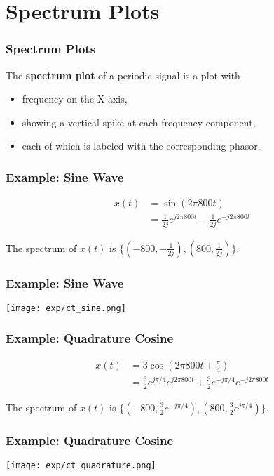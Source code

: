 \documentclass{beamer}
\begin{document}
\section[Spectrum Plots]{Spectrum Plots}
\setcounter{subsection}{1}

\begin{frame}
  \frametitle{Spectrum Plots}

  The {\bf spectrum plot} of a periodic signal is a plot with
  \begin{itemize}
  \item frequency on the X-axis,
  \item showing a vertical spike at each frequency component,
  \item each of which is labeled with the corresponding phasor.
  \end{itemize}
\end{frame}

\begin{frame}
  \frametitle{Example: Sine Wave}

  \begin{align*}
    x(t) &= \sin\left(2\pi 800t\right)\\
    &= \frac{1}{2j}e^{j2\pi 800t} - \frac{1}{2j}e^{-j2\pi 800t}
  \end{align*}

  The spectrum of $x(t)$ is $\{(-800,-\frac{1}{2j}),(800,\frac{1}{2j})\}$.
\end{frame}

\begin{frame}
  \frametitle{Example: Sine Wave}

  \centerline{\texttt{[image: exp/ct\_sine.png]}}
\end{frame}

\begin{frame}
  \frametitle{Example: Quadrature Cosine}

  \begin{align*}
    x(t) &= 3\cos\left(2\pi 800t+\frac{\pi}{4}\right)\\
    &= \frac{3}{2}e^{j\pi/4}e^{j2\pi 800t} + \frac{3}{2}e^{-j\pi/4}e^{-j2\pi 800t}
  \end{align*}

  The spectrum of $x(t)$ is $\{(-800,\frac{3}{2}e^{-j\pi/4}),(800,\frac{3}{2}e^{j\pi/4})\}$.
\end{frame}

\begin{frame}
  \frametitle{Example: Quadrature Cosine}

  \centerline{\texttt{[image: exp/ct\_quadrature.png]}}
\end{frame}
\end{document}
